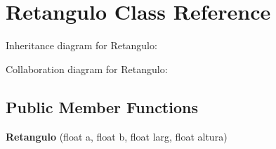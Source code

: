 \hypertarget{classRetangulo}{}\section{Retangulo Class Reference}
\label{classRetangulo}


Inheritance diagram for Retangulo\+:


Collaboration diagram for Retangulo\+:
\subsection*{Public Member Functions}
\begin{DoxyCompactItemize}
\item 
{\bfseries Retangulo} (float a, float b, float larg, float altura)\hypertarget{classRetangulo_a3b0962ea04bc028b734af09eb17b1af1}{}\label{classRetangulo_a3b0962ea04bc028b734af09eb17b1af1}


\end{DoxyCompactItemize}
